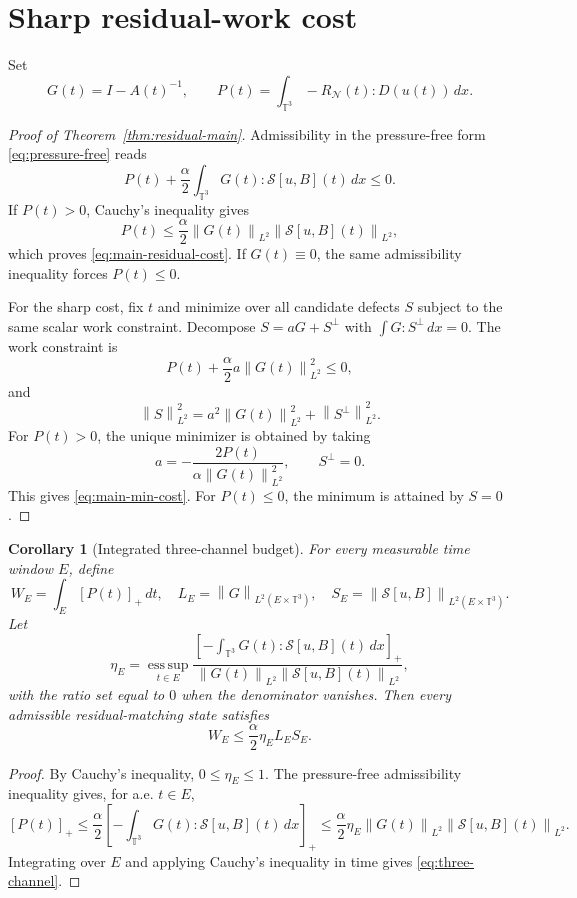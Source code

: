 \documentclass[11pt]{article}
\numberwithin{equation}{section}
\newtheorem{corollary}[theorem]{Corollary}
\newcommand{\T}{\mathbb T}
\newcommand{\Id}{I}
\newcommand{\calN}{\mathcal N}
\newcommand{\calS}{\mathcal S}
\newcommand{\norm}[1]{\left\lVert #1\right\rVert}
\begin{document}
\section{Sharp residual-work cost}

Set
\[
  G(t)=\Id-A(t)^{-1},\qquad
  P(t)=\int_{\T^3}-R_{\calN}(t):D(u(t))\,dx .
\]

\begin{proof}[Proof of Theorem~\ref{thm:residual-main}]
Admissibility in the pressure-free form \eqref{eq:pressure-free} reads
\[
  P(t)+\frac{\alpha}{2}\int_{\T^3}G(t):\calS[u,B](t)\,dx\le0 .
\]
If \(P(t)>0\), Cauchy's inequality gives
\[
  P(t)\le
  \frac{\alpha}{2}\norm{G(t)}_{L^2}\norm{\calS[u,B](t)}_{L^2},
\]
which proves \eqref{eq:main-residual-cost}.  If \(G(t)\equiv0\), the same
admissibility inequality forces \(P(t)\le0\).

For the sharp cost, fix \(t\) and minimize over all candidate defects \(S\)
subject to the same scalar work constraint.  Decompose \(S=aG+S^\perp\) with
\(\int G:S^\perp\,dx=0\).  The work constraint is
\[
  P(t)+\frac{\alpha}{2}a\norm{G(t)}_{L^2}^2\le0,
\]
and
\[
  \norm{S}_{L^2}^2=a^2\norm{G(t)}_{L^2}^2+\norm{S^\perp}_{L^2}^2.
\]
For \(P(t)>0\), the unique minimizer is obtained by taking
\[
  a=-\frac{2P(t)}{\alpha\norm{G(t)}_{L^2}^2},
  \qquad S^\perp=0.
\]
This gives \eqref{eq:main-min-cost}.  For \(P(t)\le0\), the minimum is
attained by \(S=0\).
\end{proof}

\begin{corollary}[Integrated three-channel budget]
\label{cor:three-channel}
For every measurable time window \(E\), define
\[
  W_E=\int_E[P(t)]_+\,dt,\quad
  L_E=\norm{G}_{L^2(E\times\T^3)},\quad
  S_E=\norm{\calS[u,B]}_{L^2(E\times\T^3)}.
\]
Let
\[
  \eta_E=
  \operatorname*{ess\,sup}_{t\in E}
  \frac{\left[-\int_{\T^3}G(t):\calS[u,B](t)\,dx\right]_+}
       {\norm{G(t)}_{L^2}\norm{\calS[u,B](t)}_{L^2}},
\]
with the ratio set equal to \(0\) when the denominator vanishes.  Then every
admissible residual-matching state satisfies
\begin{equation}
  W_E\le \frac{\alpha}{2}\eta_E L_ES_E .
  \label{eq:three-channel}
\end{equation}
\end{corollary}

\begin{proof}
By Cauchy's inequality, \(0\le\eta_E\le1\).  The pressure-free
admissibility inequality gives, for a.e. \(t\in E\),
\[
  [P(t)]_+
  \le
  \frac{\alpha}{2}
  \left[-\int_{\T^3}G(t):\calS[u,B](t)\,dx\right]_+
  \le
  \frac{\alpha}{2}\eta_E
  \norm{G(t)}_{L^2}\norm{\calS[u,B](t)}_{L^2}.
\]
Integrating over \(E\) and applying Cauchy's inequality in time gives
\eqref{eq:three-channel}.
\end{proof}
\end{document}
